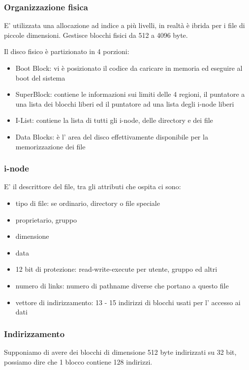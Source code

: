 \subsubsection{Organizzazione fisica}
E' utilizzata una allocazione ad indice a più livelli, in realtà è ibrida per i file di piccole dimensioni.
Gestisce blocchi fisici da 512 a 4096 byte.

Il disco fisico è partizionato in 4 porzioni:
\begin{itemize}
    \item Boot Block: vi è posizionato il codice da caricare in memoria ed eseguire al boot del sistema
    \item SuperBlock: contiene le informazioni sui limiti delle 4 regioni, il puntatore a una lista dei blocchi liberi ed il puntatore ad una lista degli i-node liberi
    \item I-List: contiene la lista di tutti gli i-node, delle directory e dei file
    \item Data Blocks: è l' area del disco effettivamente disponibile per la memorizzazione dei file
\end{itemize}

\subsubsection{i-node}
E' il descrittore del file, tra gli attributi che ospita ci sono:
\begin{itemize}
    \item tipo di file: se ordinario, directory o file speciale
    \item proprietario, gruppo
    \item dimensione
    \item data
    \item 12 bit di protezione: read-write-execute per utente, gruppo ed altri
    \item numero di links: numero di pathname diverse che portano a questo file
    \item vettore di indirizzamento: 13 - 15 indirizzi di blocchi usati per l' accesso ai dati
\end{itemize}

\subsubsection{Indirizzamento}
Supponiamo di avere dei blocchi di dimensione 512 byte indirizzati su 32 bit, possiamo dire che 1 blocco contiene 128 indirizzi.

